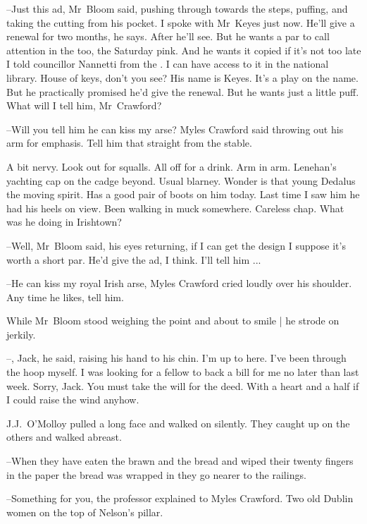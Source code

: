 --Just this ad,
Mr~Bloom said,
pushing through towards the steps,
puffing,
and taking the cutting from his pocket.
I spoke with Mr~Keyes just now.
He'll give a renewal for two months, he says.
After he'll see.
But he wants a par to call attention in the  too,
the Saturday pink.
And he wants it copied if it's not too late
I told councillor Nannetti from the .
I can have access to it in the national library.
House of keys, don't you see?
His name is Keyes.
It's a play on the name.
But he practically promised he'd give the renewal.
But he wants
just a little puff.
What will I tell him, Mr~Crawford?



--Will you tell him he can kiss my arse?
Myles Crawford said
throwing out his arm for emphasis.
Tell him that straight from the stable.

A bit nervy.
Look out for squalls.
All off for a drink.
Arm in arm.
Lenehan's yachting cap on the cadge beyond.
Usual blarney.
Wonder is that young Dedalus the moving spirit.
Has a good pair of boots on him today.
Last time I saw him he had his heels on view.
Been walking in muck somewhere.
Careless chap.
What was he doing in Irishtown?

--Well,
Mr~Bloom said,
his eyes returning,
if I can get the design
I suppose it's worth a short par.
He'd give the ad, I think.
I'll tell him ...



--He can kiss my royal Irish arse,
Myles Crawford cried loudly over his shoulder.
Any time he likes, tell him.

While Mr~Bloom stood weighing the point
and about to smile |
he strode on jerkily.



--, Jack,
he said,
raising his hand to his chin.
I'm up to here.
I've been through the hoop myself.
I was looking for a fellow to back a bill for me no later than last week.
Sorry, Jack.
You must take the will for the deed.
With a heart and a half if I could raise the wind anyhow.

J.J.~O'Molloy pulled a long face and walked on silently.
They caught up on the others and walked abreast.

--When they have eaten the brawn and the bread
and wiped their twenty fingers in the paper the bread was wrapped in
they go nearer to the railings.

--Something for you,
the professor explained to Myles Crawford.
Two old Dublin women on the top of Nelson's pillar.


